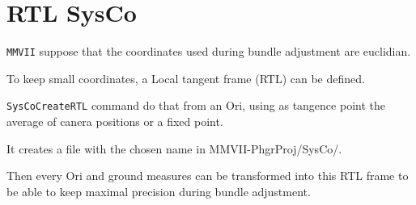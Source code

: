 \section{RTL SysCo}
\label{SysCoRTL}
{\tt MMVII} suppose that the coordinates used during bundle adjustment are euclidian.

To keep small coordinates, a Local tangent frame (RTL) can be defined.

{\tt SysCoCreateRTL} command do that from an Ori, using as tangence point the average of canera positions or a fixed point.

It creates a file with the chosen name in {MMVII-PhgrProj/SysCo/}.

Then every Ori and ground measures can be transformed into this RTL frame to be able to keep maximal precision during bundle adjustment.

